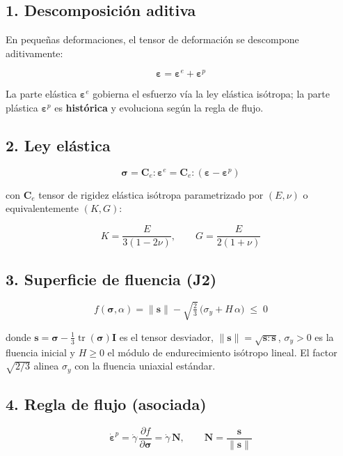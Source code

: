 \documentclass[11pt,letterpaper,oneside]{report}
\begin{document}
\subsection{1. Descomposición aditiva}

En pequeñas deformaciones, el tensor de deformación se descompone aditivamente:

\[
\boldsymbol\varepsilon = \boldsymbol\varepsilon^e + \boldsymbol\varepsilon^p
\]

La parte elástica $\boldsymbol\varepsilon^e$ gobierna el esfuerzo vía la ley elástica isótropa; la parte plástica $\boldsymbol\varepsilon^p$ es \textbf{histórica} y evoluciona según la regla de flujo.

\subsection{2. Ley elástica}

\[
\boldsymbol\sigma = \mathbf C_e : \boldsymbol\varepsilon^e = \mathbf C_e : (\boldsymbol\varepsilon - \boldsymbol\varepsilon^p)
\]

con $\mathbf C_e$ tensor de rigidez elástica isótropa parametrizado por $(E, \nu)$ o equivalentemente $(K, G)$:

\[
K = \frac{E}{3(1-2\nu)}, \qquad G = \frac{E}{2(1+\nu)}
\]

\subsection{3. Superficie de fluencia (J2)}

\[
f(\boldsymbol\sigma, \alpha) = \|\mathbf s\| - \sqrt{\tfrac{2}{3}}\,\big(\sigma_y + H\,\alpha\big) \;\leq\; 0
\]

donde $\mathbf s = \boldsymbol\sigma - \tfrac{1}{3}\operatorname{tr}(\boldsymbol\sigma)\mathbf I$ es el tensor desviador, $\|\mathbf s\| = \sqrt{\mathbf s:\mathbf s}$, $\sigma_y > 0$ es la fluencia inicial y $H \geq 0$ el módulo de endurecimiento isótropo lineal. El factor $\sqrt{2/3}$ alinea $\sigma_y$ con la fluencia uniaxial estándar.

\subsection{4. Regla de flujo (asociada)}

\[
\dot{\boldsymbol\varepsilon}^p = \dot\gamma \,\frac{\partial f}{\partial \boldsymbol\sigma} = \dot\gamma \,\mathbf N, \qquad \mathbf N = \frac{\mathbf s}{\|\mathbf s\|}
\]
\end{document}
